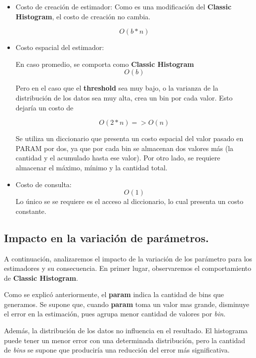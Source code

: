 \documentclass[10pt, a4paper,english,spanish,hidelinks]{article}
\begin{document}
\begin{itemize}

\item Costo de creación de estimador:
Como es una modificación del \textbf{Classic Histogram}, el costo de creación no cambia.

\begin{equation}
O(b * n)
\end{equation}

\item Costo espacial del estimador:

En caso promedio, se comporta como \textbf{Classic Histogram}
\begin{equation}
O(b)
\end{equation}

Pero en el caso que el \textbf{threshold} sea muy bajo, o la varianza de la distribución de los datos sea muy alta, crea un bin por cada valor. Esto dejaría un costo de

\begin{equation}
O(2 * n) => O(n)
\end{equation}


Se utiliza un diccionario que presenta un costo espacial del valor pasado en PARAM por dos,
ya que por cada bin se almacenan dos valores más (la cantidad y el acumulado hasta ese valor).
Por otro lado, se requiere almacenar el máximo, mínimo y la cantidad total.


\item Costo de consulta:
\begin{equation}
O(1)
\end{equation}
Lo único se se requiere es el acceso al diccionario, lo cual presenta un costo constante.
\end{itemize}


\subsection{Impacto en la variación de parámetros.}
A continuación, analizaremos el impacto de la variación de los parámetro para los estimadores y su consecuencia. En primer lugar, observaremos el comportamiento de \textbf{Classic Histogram}.

Como se explicó anteriormente, el \textbf{param} indica la cantidad de bins que generamos. Se supone que, cuando \textbf{param} toma un valor mas grande, disminuye el error en la estimación,
pues agrupa menor cantidad de valores por \textit{bin}.

Además, la distribución de los datos no influencia en el resultado. El histograma puede tener un menor error con una determinada distribución, pero la cantidad de
\textit{bins} se supone que produciría una reducción del error más significativa.
\end{document}
